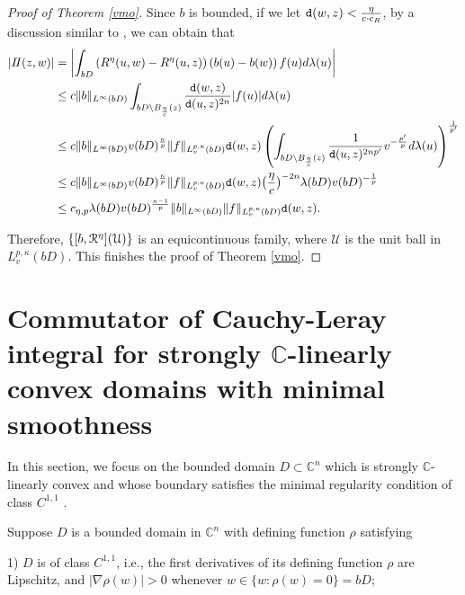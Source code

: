 \documentclass[11pt,a4paper]{amsart}
\numberwithin{equation}{section}
\def\C{\mathbb C}
\begin{document}
{\begin{proof}[Proof of   Theorem \ref{vmo}]
Since $b$ is bounded, if we let ${\tt d}(w,z)<{\eta\over c\cdot  c_R}$, by a discussion similar to \cite[p. 645]{KL2}, we can obtain that
\begin{align*}
|I\!I(z,w)|
&=\left| \int_{bD}\left(R^\eta(u,w)-R^\eta(u,z)\right)\left(b(u)-b(w)\right)f(u)d\lambda(u) \right|\\
 &\leq
c \|b\|_{L^\infty(bD)}\int_{bD\setminus B_{\eta\over c}(z)}{{\tt d}(w,z)\over {\tt d}(u,z)^{2n}} |f(u)|d\lambda(u)\\
&\leq
c \|b\|_{L^\infty(bD)}v(bD)^{{\kappa\over p}}\|f\|_{L_v^{p,\kappa}(bD)}{\tt d}(w,z)
\left(\int_{bD\setminus B_{\eta\over c}(z)}{1\over {\tt d}(u,z)^{2np'}}v^{-{p'\over p}}d\lambda(u)\right)^{1\over p'}\\
&\leq
c \|b\|_{L^\infty(bD)}v(bD)^{{\kappa\over p}}\|f\|_{L_v^{p,\kappa}(bD)}{\tt d}(w,z)\big({\eta\over c} \big)^{-2n}\lambda(bD)v(bD)^{-{1\over p}}\\
&\leq
c_{\eta,p}\lambda(bD)v(bD)^{{\kappa-1\over p}}\|b\|_{L^\infty(bD)}\|f\|_{L_v^{p,\kappa}(bD)}{\tt d}(w,z).
\end{align*}

Therefore, $\{[b, \EuScript R^\eta](\mathcal U)\}$ is an equicontinuous family, where $\mathcal U$ is the unit ball in $L_v^{p,\kappa}(bD)$.
This finishes the proof of  Theorem \ref{vmo}.
\end{proof}


\section{Commutator of Cauchy-Leray integral for strongly $\mathbb C$-linearly convex domains with minimal smoothness}
\setcounter{equation}{0}

In this section, we focus on the bounded domain $D\subset \mathbb C^n$ which is  strongly $\mathbb C$-linearly convex and whose boundary satisfies the minimal regularity condition of class $C^{1,1}$ \cite{LS2014}.


Suppose $D$ is a bounded domain in $\C^n$ with defining function $\rho$
satisfying

1) $D$ is of class $C^{1,1}$, i.e., the first derivatives of its defining function $\rho$ are Lipschitz, and $|\nabla \rho(w)|>0$ whenever $w\in\{w:\rho(w)=0\}=bD$;

}
\end{document}
